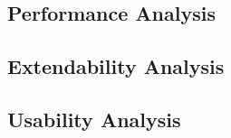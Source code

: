 \subsection{Performance Analysis}
\subsection{Extendability Analysis}
\subsection{Usability Analysis}